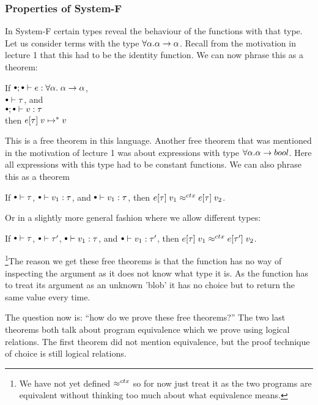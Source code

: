 \subsubsection*{Properties of System-F}
In System-F certain types reveal the behaviour of the functions with that type. Let us consider terms with the type $\forall \alpha.  \alpha \rightarrow \alpha$. Recall from the motivation in lecture 1 that this had to be the identity function. We can now phrase this as a theorem:
\begin{theorem}
  If $\mtenv ; \mtenv \vdash e : \forall \alpha. \; \tarrow{\alpha}{\alpha}$,\\ $\mtenv \vdash \tau$, and\\ $\mtenv; \mtenv \vdash v : \tau$\\ then $e[\tau]\; v \mapsto^{*} v$
\end{theorem}
This is a free theorem in this language. Another free theorem that was mentioned in the motivation of lecture 1 was about expressions with type $\forall \alpha.  \alpha \rightarrow bool$. Here all expressions with this type had to be constant functions. We can also phrase this as a theorem
\begin{theorem}
  If $\mtenv \vdash \tau$, $\mtenv \vdash v_1 : \tau$, and $\mtenv \vdash v_1 : \tau$, then $e[\tau] \; v_1 \approx^{ctx} e[\tau]\; v_2$.
\end{theorem}
Or in a slightly more general fashion where we allow different types:
\begin{theorem}
  If $\mtenv \vdash \tau$, $\mtenv \vdash \tau'$, $\mtenv \vdash v_1 : \tau$, and $\mtenv \vdash v_1 : \tau'$, then $e[\tau]\; v_1 \approx^{ctx} e[\tau']\; v_2$.
\end{theorem}
\footnote{We have not yet defined $ \approx^{ctx} $ so for now just treat it as the two programs are equivalent without thinking too much about what equivalence means.}The reason we get these free theorems is that the function has no way of inspecting the argument as it does not know what type it is. As the function has to treat its argument as an unknown 'blob' it has no choice but to return the same value every time.

The question now is: ``how do we prove these free theorems?'' The two last theorems both talk about program equivalence which we prove using logical relations. The first theorem did not mention equivalence, but the proof technique of choice is still logical relations.

